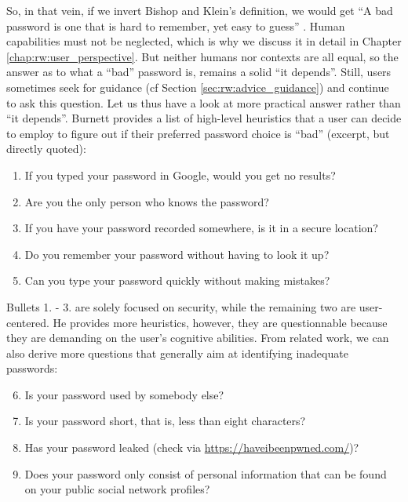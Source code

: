 So, in that vein, if we invert Bishop and Klein's definition, we would get ``A bad password is one that is hard to remember, yet easy to guess'' \cite{Bishop1995ProactivePasswordChecking}. Human capabilities must not be neglected, which is why we discuss it in detail in Chapter \ref{chap:rw:user_perspective}. But neither humans nor contexts are all equal, so the answer as to what a ``bad'' password is, remains a solid ``it depends''. Still, users sometimes seek for guidance (cf Section \ref{sec:rw:advice_guidance}) and continue to ask this question. Let us thus have a look at more practical answer rather than ``it depends''. Burnett provides a list of high-level heuristics that a user can decide to employ to figure out if their preferred password choice is ``bad'' \cite{Burnett2005PerfectPasswords} (excerpt, but directly quoted):
\begin{enumerate}
	\item If you typed your password in Google, would you get no results?
	\item Are you the only person who knows the password?
	\item If you have your password recorded somewhere, is it in a secure location?
	\item Do you remember your password without having to look it up?
	\item Can you type your password quickly without making mistakes?
\end{enumerate}
Bullets 1. - 3. are solely focused on security, while the remaining two are user-centered. He provides more heuristics, however, they are questionnable because they are demanding on the user's cognitive abilities. From related work, we can also derive more questions that generally aim at identifying inadequate passwords:
\begin{enumerate}\setcounter{enumi}{5}
	\item Is your password used by somebody else? \cite{Bonneau2012ScienceOfGuessing}
	\item Is your password short, that is, less than eight characters? \cite{Weir2010MetricsPolicies}
	\item Has your password leaked (check via \url{https://haveibeenpwned.com/})? \cite{Wheeler2016zxcvbn}
	\item Does your password only consist of personal information that can be found on your public social network profiles? \cite{Li2017PersonalInformation}
\end{enumerate}

